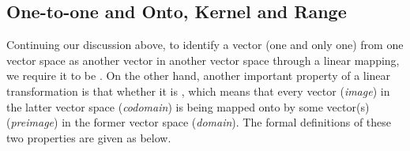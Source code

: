 \subsection{One-to-one and Onto, Kernel and Range}

Continuing our discussion above, to identify a vector (one and only one) from one vector space as another vector in another vector space through a linear mapping, we require it to be . On the other hand, another important property of a linear transformation is that whether it is , which means that every vector (\textit{image}) in the latter vector space (\textit{codomain}) is being mapped onto by some vector(s) (\textit{preimage}) in the former vector space (\textit{domain}). The formal definitions of these two properties are given as below.


